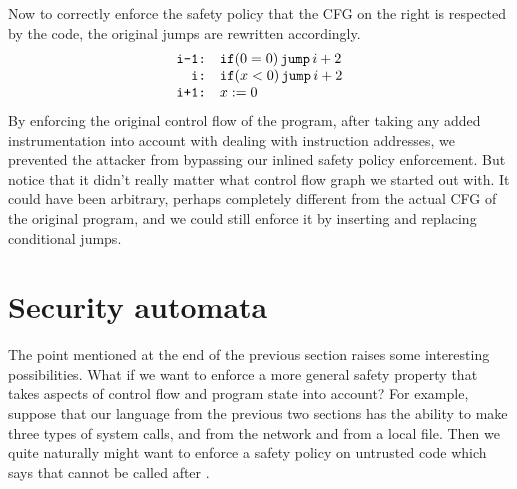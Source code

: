 \documentclass[11pt,twoside]{scrartcl}
\begin{document}
Now to correctly enforce the safety policy that the CFG on the right is respected by the code, the original jumps are rewritten accordingly.
\[
\begin{array}{rl}
\texttt{\upshape i-1:} & \texttt{\upshape if}(0=0)\,\texttt{\upshape jump}\,i+2 \\
\texttt{\upshape i:} & \texttt{\upshape if}(x < 0)\,\texttt{\upshape jump}\,i+2 \\
\texttt{\upshape i+1:} & x := 0
\end{array}
\]
By enforcing the original control flow of the program, after taking any added instrumentation into account with dealing with instruction addresses, we prevented the attacker from bypassing our inlined safety policy enforcement. But notice that it didn't really matter what control flow graph we started out with. It could have been arbitrary, perhaps completely different from the actual CFG of the original program, and we could still enforce it by inserting and replacing conditional jumps.

\section{Security automata}

The point mentioned at the end of the previous section raises some interesting possibilities. What if we want to enforce a more general safety property that takes aspects of control flow and program state into account? For example, suppose that our language from the previous two sections has the ability to make three types of system calls, \psend and \precv from the network and \pread from a local file. Then we quite naturally might want to enforce a safety policy on untrusted code which says that \psend cannot be called after \pread.
\end{document}
